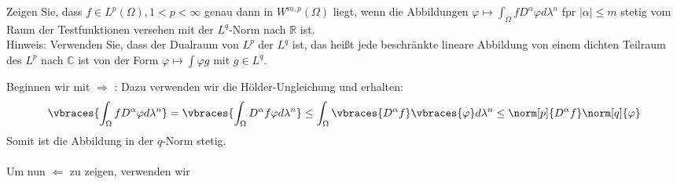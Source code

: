 \begin{exercise}

Zeigen Sie, dass $f \in L^p(\Omega), 1 < p < \infty$ genau dann in $W^{m,p}(\Omega)$ liegt, wenn die Abbildungen $\varphi \mapsto \int_{\Omega}fD^{\alpha}\varphi d\lambda^n$ fpr $|\alpha| \leq m$ stetig vom Raum der Testfunktionen versehen mit der $L^q$-Norm nach $\mathbb{R}$ ist. \\

Hinweis: Verwenden Sie, dass der Dualraum von $L^p$ der $L^q$ ist, das heißt jede beschränkte lineare Abbildung von einem dichten Teilraum des $L^p$ nach $\mathbb{C}$ ist von der Form $\varphi \mapsto \int \varphi g$ mit $g \in L^q$.

\end{exercise}

\begin{solution}

Beginnen wir mit $\Rightarrow$ : Dazu verwenden wir die Hölder-Ungleichung
und erhalten:
\begin{equation*}
  \vbraces{\int_{\Omega}fD^{\alpha}\varphi d\lambda^n} =
  \vbraces{\int_{\Omega}D^{\alpha}f\varphi d\lambda^n} \leq
  \int_{\Omega}\vbraces{D^{\alpha}f}\vbraces{\varphi}d\lambda^n \leq
  \norm[p]{D^{\alpha}f}\norm[q]{\varphi}
\end{equation*}
Somit ist die Abbildung in der $q$-Norm stetig. \\ \\
Um nun $\Leftarrow$ zu zeigen, verwenden wir
\end{solution}
